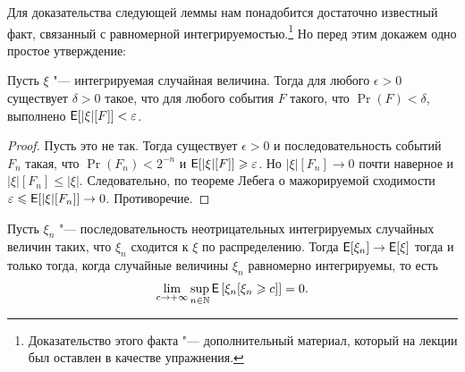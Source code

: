 Для доказательства следующей леммы нам понадобится достаточно известный факт, связанный с равномерной интегрируемостью.\footnote{Доказательство этого факта "--- дополнительный материал, который на лекции был оставлен в качестве упражнения.} Но перед этим докажем одно простое утверждение:
\begin{lemma}
    Пусть $\xi$ "--- интегрируемая случайная величина. Тогда для любого $\epsilon > 0$ существует $\delta > 0$ такое, что для любого события $F$ такого, что $\Pr(F) < \delta$, выполнено $\operatorname{\mathsf{E}}[|\xi|[F]] < \varepsilon$.
\end{lemma}
\begin{proof}
    Пусть это не так. Тогда существует $\epsilon > 0$ и последовательность событий $F_{n}$ такая, что $\Pr(F_{n}) < 2^{-n}$ и $\operatorname{\mathsf{E}}[|\xi|[F]] \geqslant \varepsilon$. Но $|\xi|[F_{n}] \to 0$ почти наверное и $|\xi|[F_{n}] \leq |\xi|$. Следовательно, по теореме Лебега о мажорируемой сходимости $\varepsilon \leqslant \operatorname{\mathsf{E}}[|\xi|[F_{n}]] \to 0$. Противоречие.
\end{proof}
\begin{theorem}
    Пусть $\xi_{n}$ "--- последовательность неотрицательных интегрируемых случайных величин таких, что $\xi_{n}$ сходится к $\xi$ по распределению. Тогда $\operatorname{\mathsf{E}}[\xi_{n}] \to \operatorname{\mathsf{E}}[\xi]$ тогда и только тогда, когда случайные величины $\xi_{n}$ равномерно интегрируемы, то есть
    \[
        \lim_{c \to +\infty} \sup_{n \in \mathbb{N}} \operatorname{\mathsf{E}}\left[\xi_{n}[\xi_{n} \geqslant c]\right] = 0.
    \]
\end{theorem}
